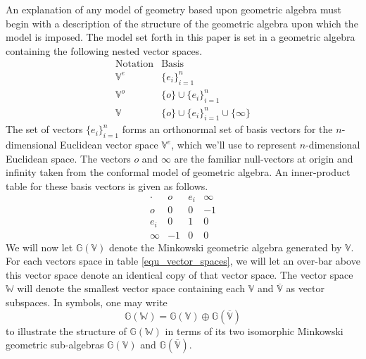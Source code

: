 \documentclass{birkjour}
\theoremstyle{definition}
\theoremstyle{remark}
\numberwithin{equation}{section}
\newcommand{\G}{\mathbb{G}}
\newcommand{\V}{\mathbb{V}}
\newcommand{\Vb}{\mathbb{\overline{V}}}
\newcommand{\W}{\mathbb{W}}
\newcommand{\nvao}{o}
\newcommand{\nvai}{\infty}
\begin{document}
An explanation of any model of geometry based upon geometric algebra must
begin with a description of the structure of the geometric algebra upon
which the model is imposed.  The model set forth in this paper is set in a
geometric algebra containing the following nested vector spaces.
\begin{equation}\label{equ_vector_spaces}
\begin{array}{ll}
\mbox{Notation} & \mbox{Basis} \\
\hline
\V^e & \{e_i\}_{i=1}^n \\
\V^o & \{\nvao\}\cup\{e_i\}_{i=1}^n \\
\V & \{\nvao\}\cup\{e_i\}_{i=1}^n\cup\{\nvai\}
\end{array}
\end{equation}
The set of vectors $\{e_i\}_{i=1}^n$ forms an orthonormal set of basis
vectors for the $n$-dimensional Euclidean vector space $\V^e$, which we'll
use to represent $n$-dimensional Euclidean space.
The vectors $\nvao$ and $\nvai$ are the familiar null-vectors at origin and infinity
taken from the conformal model of geometric algebra.  An inner-product
table for these basis vectors is given as follows.
\begin{equation}
\begin{array}{c|ccc}
\cdot & \nvao & e_i & \nvai \\
\hline
\nvao & 0 & 0 & -1 \\
e_i & 0 & 1 & 0 \\
\nvai & -1 & 0 & 0
\end{array}
\end{equation}
We will now let $\G(\V)$ denote the Minkowski geometric algebra generated by $\V$.
For each vectors space in table \eqref{equ_vector_spaces}, we will let an over-bar
above this vector space denote an identical copy of that vector space.  The vector
space $\W$ will denote the smallest vector space containing each $\V$ and $\Vb$
as vector subspaces.  In symbols, one may write
\begin{equation}
\G(\W) = \G(\V)\oplus\G(\Vb)
\end{equation}
to illustrate the structure of $\G(\W)$ in terms of its two isomorphic Minkowski
geometric sub-algebras $\G(\V)$ and $\G(\Vb)$.
\end{document}

